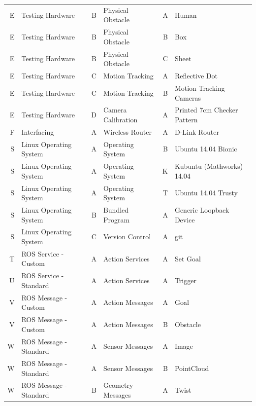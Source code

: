 \documentclass{article}
\begin{document}
\begin{table}
\begin{tabular}{|rl|rl|rl|}
			E & Testing Hardware       & B & Physical Obstacle  & A   & Human                             \\
			E & Testing Hardware       & B & Physical Obstacle  & B   & Box                               \\
			E & Testing Hardware       & B & Physical Obstacle  & C   & Sheet                             \\
			E & Testing Hardware       & C & Motion Tracking    & A   & Reflective Dot                    \\
			E & Testing Hardware       & C & Motion Tracking    & B   & Motion Tracking Cameras           \\
			E & Testing Hardware       & D & Camera Calibration & A   & Printed 7cm Checker Pattern       \\ \hline
			F & Interfacing            & A & Wireless Router    & A   & D-Link Router                     \\ \hline
			S & Linux Operating System & A & Operating System   & B   & Ubuntu 14.04 Bionic               \\
			S & Linux Operating System & A & Operating System   & K   & Kubuntu (Mathworks) 14.04         \\
			S & Linux Operating System & A & Operating System   & T   & Ubuntu 14.04 Trusty               \\
			S & Linux Operating System & B & Bundled Program    & A   & Generic Loopback Device           \\
			S & Linux Operating System & C & Version Control    & A   & git                               \\ \hline
			T & ROS Service - Custom   & A & Action Services    & A   & Set Goal                          \\ \hline
			U & ROS Service - Standard & A & Action Services    & A   & Trigger                           \\ \hline
			V & ROS Message - Custom   & A & Action Messages    & A   & Goal                              \\
			V & ROS Message - Custom   & A & Action Messages    & B   & Obstacle                          \\ \hline
			W & ROS Message - Standard & A & Sensor Messages    & A   & Image                             \\
			W & ROS Message - Standard & A & Sensor Messages    & B   & PointCloud                        \\
			W & ROS Message - Standard & B & Geometry Messages  & A   & Twist                             \\

\end{tabular}
\end{table}
\end{document}
